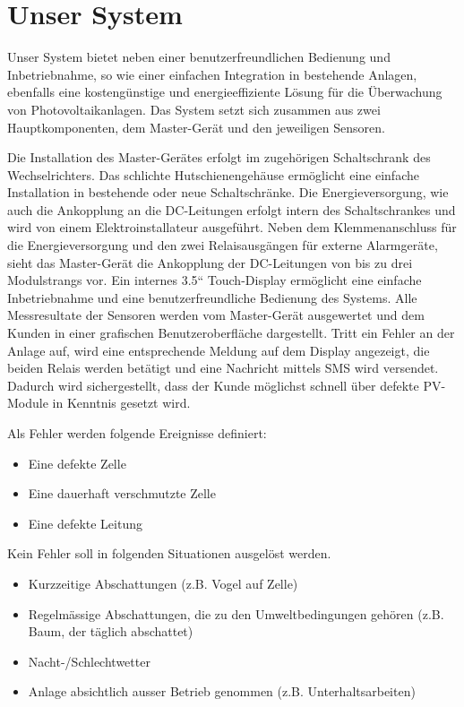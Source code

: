 \clearpage
\section{Unser System}
\label{sec:ourSystem}

Unser   System  bietet   neben   einer   benutzerfreundlichen  Bedienung   und
Inbetriebnahme,  so wie  einer  einfachen Integration  in bestehende  Anlagen,
ebenfalls  eine  kosteng\"unstige  und energieeffiziente  L\"osung  f\"ur  die
\"Uberwachung von Photovoltaikanlagen. Das System setzt sich zusammen aus zwei
Hauptkomponenten, dem Master-Ger\"at und den jeweiligen Sensoren.

Die Installation  des Master-Ger\"ates erfolgt im  zugeh\"origen Schaltschrank
des  Wechselrichters. Das  schlichte  Hutschienengeh\"ause  erm\"oglicht  eine
einfache   Installation   in   bestehende  oder   neue   Schaltschr\"anke. Die
Energieversorgung,  wie  auch  die  Ankopplung  an  die  DC-Leitungen  erfolgt
intern   des   Schaltschrankes   und  wird   von   einem   Elektroinstallateur
ausgef\"uhrt. Neben dem  Klemmenanschluss f\"ur die Energieversorgung  und den
zwei Relaisausg\"angen  f\"ur externe Alarmger\"ate, sieht  das Master-Ger\"at
die  Ankopplung  der  DC-Leitungen  von  bis  zu  drei  Modulstrangs  vor. Ein
internes 3.5“ Touch-Display erm\"oglicht eine einfache Inbetriebnahme und eine
benutzerfreundliche  Bedienung des  Systems. Alle  Messresultate der  Sensoren
werden  vom Master-Ger\"at  ausgewertet  und dem  Kunden  in einer  grafischen
Benutzeroberfl\"ache  dargestellt. Tritt ein  Fehler an  der Anlage  auf, wird
eine entsprechende Meldung auf dem Display angezeigt, die beiden Relais werden
bet\"atigt  und  eine  Nachricht  mittels  SMS  wird  versendet. Dadurch  wird
sichergestellt, dass der Kunde m\"oglichst schnell \"uber defekte PV-Module in
Kenntnis gesetzt wird.

Als Fehler werden folgende Ereignisse definiert:
\begin{itemize}
    \firmlist
    \item
        Eine defekte Zelle
    \item
        Eine dauerhaft verschmutzte Zelle
    \item
        Eine defekte Leitung
\end{itemize}

Kein Fehler soll in folgenden Situationen ausgel\"ost werden.
\begin{itemize}
    \firmlist
    \item
        Kurzzeitige Abschattungen (z.B. Vogel auf Zelle)
    \item
        Regelm\"assige Abschattungen,  die zu den  Umweltbedingungen geh\"oren
        (z.B. Baum, der t\"aglich abschattet)
    \item
        Nacht-/Schlechtwetter
    \item
        Anlage absichtlich ausser Betrieb genommen (z.B. Unterhaltsarbeiten)
\end{itemize}

